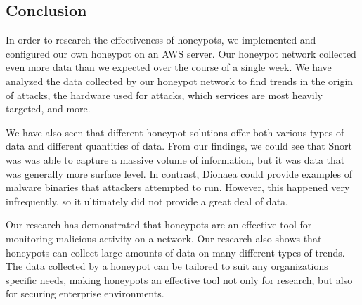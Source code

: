 \documentclass[a0,landscape]{a0poster}
\begin{document}
\begin{multicols}{3}

\section*{Conclusion}
In order to research the effectiveness of honeypots, we implemented and configured our own honeypot on an AWS server. Our honeypot network collected even more data than we expected over the course of a single week. We have analyzed the data collected by our honeypot network to find trends in the origin of attacks, the hardware used for attacks, which services are most heavily targeted, and more. 

We have also seen that different honeypot solutions offer both various types of data and different quantities of data. From our findings, we could see that Snort was was able to capture a massive volume of information, but it was data that was generally more surface level. In contrast, Dionaea could provide examples of malware binaries that attackers attempted to run. However, this happened very infrequently, so it ultimately did not provide a great deal of data.

Our research has demonstrated that honeypots are an effective tool for monitoring malicious activity on a network. Our research also shows that honeypots can collect large amounts of data on many different types of trends. The data collected by a honeypot can be tailored to suit any organizations specific needs, making honeypots an effective tool not only for research, but also for securing enterprise environments. 


\end{multicols}
\end{document}
